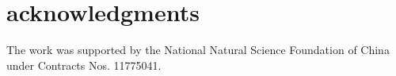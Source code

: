 \documentclass[%
reprint,
superscriptaddress,
showpacs,preprintnumbers,
 amsmath,amssymb,
 aps,
prl,
]{revtex4-1}
\begin{document}
\section{acknowledgments}

The work was supported by the National Natural Science Foundation of China under Contracts Nos. 11775041.





\end{document}
